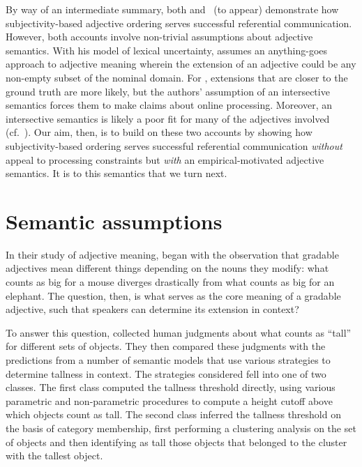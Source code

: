 \documentclass[10pt,a4paper]{article}
\begin{document}
By way of an intermediate summary, both  and \citeauthor{scontrasetalSPadjectives}~(to appear) demonstrate how subjectivity-based adjective ordering serves successful referential communication. However, both accounts involve non-trivial assumptions about adjective semantics. With his model of lexical uncertainty, \citeauthor{simonic2018} assumes an anything-goes approach to adjective meaning wherein the extension of an adjective could be any non-empty subset of the nominal domain. For \citeauthor{scontrasetalSPadjectives}, extensions that are closer to the ground truth are more likely, but the authors' assumption of an intersective semantics forces them to make claims about online processing. Moreover, an intersective semantics is likely a poor fit for many of the adjectives involved (cf.~). Our aim, then, is to build on these two accounts by showing how subjectivity-based ordering serves successful referential communication \emph{without} appeal to processing constraints but \emph{with} an empirical-motivated adjective semantics. It is to this semantics that we turn next.

\section{Semantic assumptions}

In their study of adjective meaning,  began with the observation that gradable adjectives mean different things depending on the nouns they modify: what counts as big for a mouse diverges drastically from what counts as big for an elephant. The question, then, is what serves as the core meaning of a gradable adjective, such that speakers can determine its extension in context? 
 
To answer this question, \citeauthor{schmidtetal2009} collected human judgments about what counts as ``tall'' for different sets of objects. They then compared these judgments with the predictions from a number of semantic models that use various strategies to determine tallness in context. The strategies considered fell into one of two classes. The first class computed the tallness threshold directly, using various parametric and non-parametric procedures to compute a height cutoff above which objects count as tall. The second class inferred the tallness threshold on the basis of category membership, first performing a clustering analysis on the set of objects and then identifying as tall those objects that belonged to the cluster with the tallest object.
\end{document}
